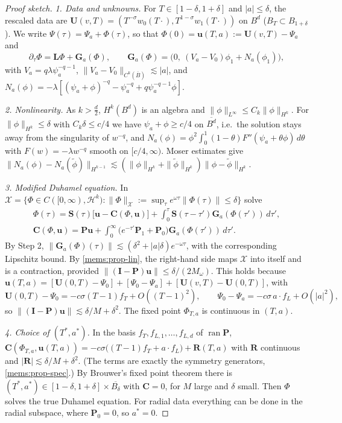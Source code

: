 \begin{proof}[Proof sketch]
\emph{1. Data and unknowns.} For $T\in[1-\delta,1+\delta]$ and $|a|\le\delta$, the
rescaled data are $\mathbf U(v,T)=(T^{-\sigma}w_0(T\cdot),T^{1-\sigma}w_1(T\cdot))$ on
$B^d$ ($B_T\subset B_{1+\delta}$). We write $\Psi(\tau)=\Psi_a+\Phi(\tau)$, so that
$\Phi(0)=\mathbf u(T,a):=\mathbf U(v,T)-\Psi_a$ and
\[
  \partial_\tau\Phi=\mathbf L\Phi+\mathbf G_a(\Phi),\qquad
  \mathbf G_a(\Phi)=\big(0,\ (V_a-V_0)\phi_1+N_a(\phi_1)\big),
\]
with $V_a=q\lambda\psi_a^{-q-1}$, $\|V_a-V_0\|_{C^k(\overline B)}\lesssim|a|$,
and $N_a(\phi)=-\lambda[(\psi_a+\phi)^{-q}-\psi_a^{-q}+q\psi_a^{-q-1}\phi]$.

\emph{2. Nonlinearity.} As $k>\frac d2$, $H^k(B^d)$ is an algebra and
$\|\phi\|_{L^\infty}\le C_k\|\phi\|_{H^k}$. For $\|\phi\|_{H^k}\le\delta$ with $C_k\delta\le c/4$
we have $\psi_a+\phi\ge c/4$ on $\overline{B^d}$, i.e.\ the solution stays away from
the singularity of $w^{-q}$, and $N_a(\phi)=\phi^2\int_0^1(1-\theta)F''(\psi_a+\theta\phi)\,d\theta$ with
$F(w)=-\lambda w^{-q}$ smooth on $[c/4,\infty)$. Moser estimates give
$\|N_a(\phi)-N_a(\tilde\phi)\|_{H^{k-1}}\lesssim(\|\phi\|_{H^k}+\|\tilde\phi\|_{H^k})\|\phi-\tilde\phi\|_{H^k}$.

\emph{3. Modified Duhamel equation.} In
$\mathcal X=\{\Phi\in C([0,\infty),\mathcal H^k):\|\Phi\|_{\mathcal X}:=\sup_\tau e^{\omega\tau}\|\Phi(\tau)\|\le\delta\}$ solve
\begin{gather*}
  \Phi(\tau)=\mathbf S(\tau)\big[\mathbf u-\mathbf C(\Phi,\mathbf u)\big]+\int_0^\tau\mathbf S(\tau-\tau')\mathbf G_a(\Phi(\tau'))\,d\tau',\\
  \mathbf C(\Phi,\mathbf u)=\mathbf P\mathbf u+\int_0^\infty\big(e^{-\tau'}\mathbf P_1+\mathbf P_0\big)\mathbf G_a(\Phi(\tau'))\,d\tau'.
\end{gather*}
By Step 2, $\|\mathbf G_a(\Phi)(\tau)\|\lesssim(\delta^2+|a|\delta)e^{-\omega\tau}$, with the
corresponding Lipschitz bound. By \cref{mems:prop-lin}, the
right-hand side maps $\mathcal X$ into itself and is a contraction, provided
$\|(\mathbf I-\mathbf P)\mathbf u\|\le\delta/(2M_\omega)$. This holds because
$\mathbf u(T,a)=[\mathbf U(0,T)-\Psi_0]+[\Psi_0-\Psi_a]+[\mathbf U(v,T)-\mathbf U(0,T)]$, with
\[
  \mathbf U(0,T)-\Psi_0=-c\sigma(T-1)f_T+O((T-1)^2),\qquad
  \Psi_0-\Psi_a=-c\sigma\,a\cdot f_L+O(|a|^2),
\]
so $\|(\mathbf I-\mathbf P)\mathbf u\|\lesssim\delta/M+\delta^2$. The fixed point $\Phi_{T,a}$ is
continuous in $(T,a)$.

\emph{4. Choice of $(T^*,a^*)$.} In the basis $f_T,f_{L,1},\dots,f_{L,d}$ of
$\operatorname{ran}\mathbf P$,
$\mathbf C(\Phi_{T,a},\mathbf u(T,a))=-c\sigma\big((T-1)f_T+a\cdot f_L\big)+\mathbf R(T,a)$ with
$\mathbf R$ continuous and $|\mathbf R|\lesssim\delta/M+\delta^2$. (The terms are
exactly the symmetry generators, \cref{mems:prop-spec}.) By Brouwer's fixed
point theorem there is $(T^*,a^*)\in[1-\delta,1+\delta]\times\overline{B_\delta}$ with
$\mathbf C=0$, for $M$ large and $\delta$ small. Then $\Phi$ solves the true Duhamel
equation. For radial data everything can be done in the radial subspace,
where $\mathbf P_0=0$, so $a^*=0$.


\end{proof}
